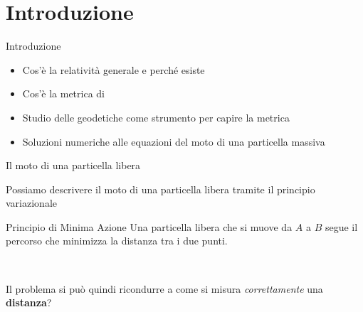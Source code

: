 
\section{Introduzione}


\begin{frame}{Introduzione}
    \begin{itemize}
        \item Cos'è la relatività generale e perché esiste
        \item Cos'è la metrica di \Sh
        \item Studio delle geodetiche come strumento per capire la metrica
        \item Soluzioni numeriche alle equazioni del moto di una particella
            massiva
    \end{itemize}
\end{frame}


\begin{frame}{Il moto di una particella libera}

    Possiamo descrivere il moto di una particella libera tramite il principio
    variazionale \\

    \begin{block}{Principio di Minima Azione}
        {Una particella libera che si muove da $A$ a $B$ segue il percorso che
        minimizza la distanza tra i due punti.}
    \end{block}

    ~

    Il problema si può quindi ricondurre a come si misura \textit{correttamente}
    una \textbf{distanza}?

\end{frame}


